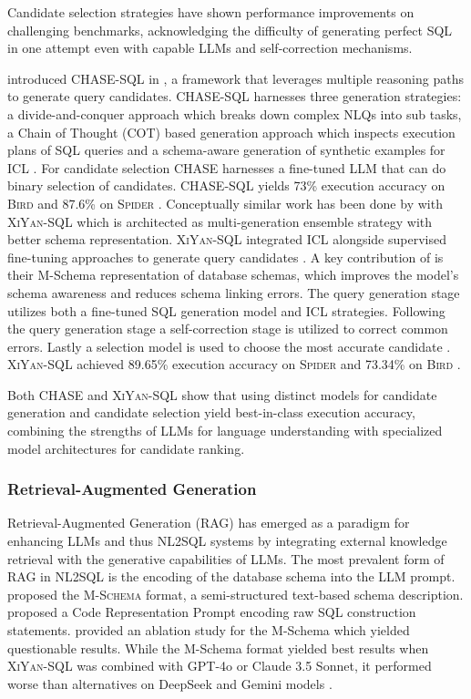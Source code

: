 Candidate selection strategies have shown performance improvements on
challenging benchmarks, acknowledging the difficulty of generating perfect SQL
in one attempt even with capable LLMs and self-correction mechanisms.

\cite{CHASE} introduced CHASE-SQL in \citeyear{CHASE}, a framework that
leverages multiple reasoning paths to generate query candidates. CHASE-SQL
harnesses three generation strategies: a divide-and-conquer approach which
breaks down complex NLQs into sub tasks, a Chain of Thought (COT) based
generation approach which inspects execution plans of SQL queries and a
schema-aware generation of synthetic examples for ICL \citep{CHASE}. For
candidate selection CHASE harnesses a fine-tuned LLM that can do binary
selection of candidates. CHASE-SQL yields 73\% execution accuracy on
\textsc{Bird} and 87.6\% on \textsc{Spider} \citep{CHASE}. Conceptually similar
work has been done by \citeauthor*{XiYan} with \textsc{XiYan-SQL} which is
architected as multi-generation ensemble strategy with better schema
representation. \textsc{XiYan-SQL} integrated ICL alongside supervised
fine-tuning approaches to generate query candidates \citep{XiYan}. A key
contribution of \cite{XiYan} is their M-Schema representation of database
schemas, which improves the model's schema awareness and reduces schema linking
errors. The query generation stage utilizes both a fine-tuned SQL generation
model and ICL strategies. Following the query generation stage a
self-correction stage is utilized to correct common errors. Lastly a selection
model is used to choose the most accurate candidate \citep{XiYan}.
\textsc{XiYan-SQL} achieved 89.65\% execution accuracy on \textsc{Spider} and
73.34\% on \textsc{Bird} \citep{XiYan}.

Both CHASE and \textsc{XiYan-SQL} show that using distinct models for candidate
generation and candidate selection yield best-in-class execution accuracy,
combining the strengths of LLMs for language understanding with specialized
model architectures for candidate ranking.

\subsubsection{Retrieval-Augmented Generation}

Retrieval-Augmented Generation (RAG) has emerged as a paradigm for enhancing
LLMs and thus NL2SQL systems by integrating external knowledge retrieval with
the generative capabilities of LLMs. The most prevalent form of RAG in NL2SQL
is the encoding of the database schema into the LLM prompt. \cite{XiYan}
proposed the \textsc{M-Schema} format, a semi-structured text-based schema
description. \cite{DAIL-SQL} proposed a Code Representation Prompt encoding raw
SQL construction statements. \cite{XiYan} provided an ablation study for the
M-Schema which yielded questionable results. While the M-Schema format yielded
best results when \textsc{XiYan-SQL} was combined with GPT-4o or Claude 3.5
Sonnet, it performed worse than alternatives on DeepSeek and Gemini models
\citep{XiYan}.

